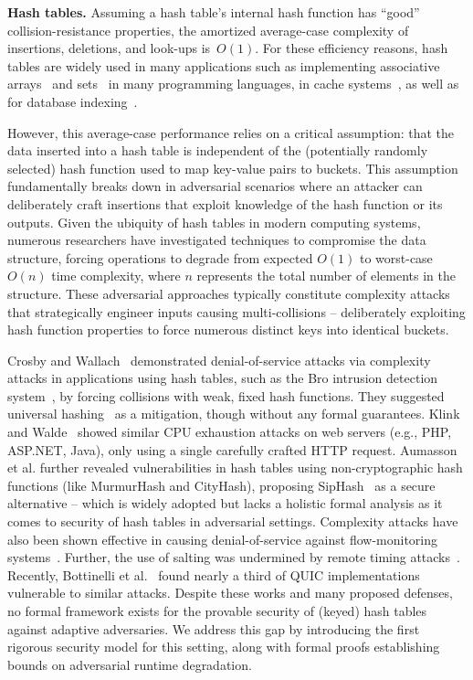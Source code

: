 \textbf{Hash tables.} Assuming a hash table's internal hash function has ``good'' collision-resistance properties, the amortized average-case complexity of insertions, deletions, and look-ups is~$O(1)$. For these efficiency reasons, hash tables are widely used in many applications such as implementing associative arrays~\cite{mehlhorn2008hash} and sets~\cite{blandy2021programming} in many programming languages, in cache systems~\cite{istvan2015hash}, as well as for database indexing~\cite{zobel2001memory}.

However, this average-case performance relies on a critical assumption: that the data inserted into a hash table is independent of the (potentially randomly selected) hash function used to map key-value pairs to buckets. This assumption fundamentally breaks down in adversarial scenarios where an attacker can deliberately craft insertions that exploit knowledge of the hash function or its outputs. Given the ubiquity of hash tables in modern computing systems, numerous researchers \cite{paxson1999bro, CrosbyW03, bar2007remote, eckhoff2009hash, klink2011efficient, aumasson2012hash,bottinelli2025hash} have investigated techniques to compromise the data structure, forcing operations to degrade from expected $O(1)$ to worst-case $O(n)$ time complexity, where $n$ represents the total number of elements in the structure. These adversarial approaches typically constitute complexity attacks that strategically engineer inputs causing multi-collisions -- deliberately exploiting hash function properties to force numerous distinct keys into identical buckets.

Crosby and Wallach~\cite{CrosbyW03} demonstrated denial-of-service attacks via complexity attacks in applications using hash tables, such as the Bro intrusion detection system~\cite{paxson1999bro}, by forcing collisions with weak, fixed hash functions. They suggested universal hashing~\cite{carter1977universal} as a mitigation, though without any formal guarantees. Klink and Walde~\cite{klink2011efficient} showed similar CPU exhaustion attacks on web servers (e.g., PHP, ASP.NET, Java), only using a single carefully crafted HTTP request. Aumasson et al.\cite{aumasson2012hash} further revealed vulnerabilities in hash tables using non-cryptographic hash functions (like MurmurHash and CityHash\cite{appleby2016smhasher}), proposing SipHash~\cite{aumasson2012hash} as a secure alternative -- which is widely adopted but lacks a holistic formal analysis as it comes to security of hash tables in adversarial settings. Complexity attacks have also been shown effective in causing denial-of-service against flow-monitoring systems~\cite{eckhoff2009hash}. Further, the use of salting was undermined by remote timing attacks~\cite{bar2007remote}. Recently, Bottinelli et al.~\cite{bottinelli2025hash} found nearly a third of QUIC implementations vulnerable to similar attacks. Despite these works and many proposed defenses, no formal framework exists for the provable security of (keyed) hash tables against adaptive adversaries. We address this gap by introducing the first rigorous security model for this setting, along with formal proofs establishing bounds on adversarial runtime degradation.

